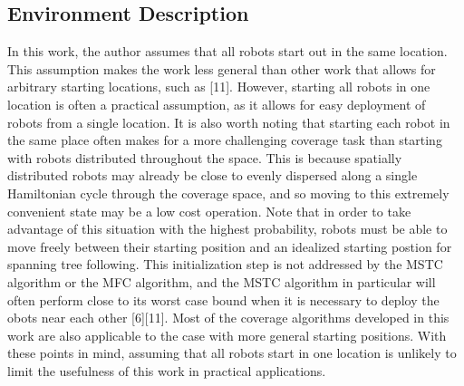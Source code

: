 
\subsection{Environment Description}

In this work, the author assumes that all robots start out in the same location. This assumption makes the work less general than other work that allows for arbitrary starting locations, such as [11]. However, starting all robots in one location is often a practical assumption, as it allows for easy deployment of robots from a single location. It is also worth noting that starting each robot in the same place often makes for a more challenging coverage task than starting with robots distributed throughout the space. This is because spatially distributed robots may already be close to evenly dispersed along a single Hamiltonian cycle through the coverage space, and so moving to this extremely convenient state may be a low cost operation. Note that in order to take advantage of this situation with the highest probability, robots must be able to move freely between their starting position and an idealized starting postion for spanning tree following. This initialization step is not addressed by the MSTC algorithm or the MFC algorithm, and the MSTC algorithm in particular will often perform close to its worst case bound when it is necessary to deploy the obots near each other [6][11]. Most of the coverage algorithms developed in this work are also applicable to the case with more general starting positions. With these points in mind, assuming that all robots start in one location is unlikely to limit the usefulness of this work in practical applications.

